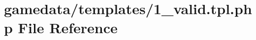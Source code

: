 \hypertarget{1__valid_8tpl_8php}{\section{gamedata/templates/1\+\_\+valid.tpl.\+php File Reference}
\label{1__valid_8tpl_8php}
}
